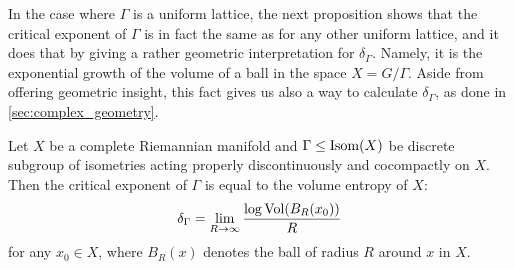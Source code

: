 \documentclass{report}
\begin{document}
In the case where $\Gamma$ is a uniform lattice, the next proposition shows that the critical exponent of $\Gamma$ is in fact the same as for any other uniform lattice, and it does that by giving a rather geometric interpretation for $\delta_\Gamma$.
Namely, it is the exponential growth of the volume of a ball in the space $X = G/\Gamma$.
Aside from offering geometric insight, this fact gives us also a way to calculate $\delta_\Gamma$, as done in \cref{sec:complex_geometry}.
\begin{lemma}\label{lem:critical_exponent_entropy}
    Let $X$ be a complete Riemannian manifold and $\Gamma \leq \operatorname{Isom}(X)$ be discrete subgroup of isometries acting properly discontinuously and cocompactly on $X$.
    Then the critical exponent of $\Gamma$ is equal to the volume entropy of $X$:
    \[
    \delta_\Gamma = \lim_{R \to \infty} \frac{\log \operatorname{Vol}(B_R(x_0))}{R}
    \]
    for any $x_0 \in X$, where $B_R(x)$ denotes the ball of radius $R$ around $x$ in $X$.
\end{lemma}
\end{document}
